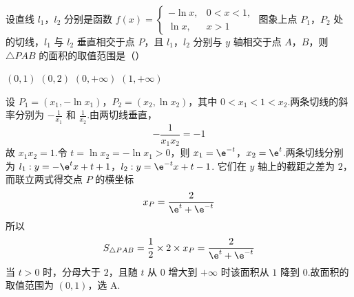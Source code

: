 \begin{problem}
设直线 \(l_1\)，\(l_2\) 分别是函数
\(f(x)=\begin{cases}
-\ln x,&0<x<1,\\
\ln x,&x>1
\end{cases}\)
图象上点 \(P_1\)，\(P_2\) 处的切线，\(l_1\) 与 \(l_2\) 垂直相交于点 \(P\)，且 \(l_1\)，\(l_2\) 分别与 \(y\) 轴相交于点 \(A\)，\(B\)，则 \(\triangle PAB\) 的面积的取值范围是（\quad）

\choices
    {\(\left(0,1\right)\)}
    {\(\left(0,2\right)\)}
    {\(\left(0,+\infty\right)\)}
    {\(\left(1,+\infty\right)\)}

\begin{solution}
设 \(P_1=(x_1,-\ln x_1)\)，\(P_2=(x_2,\ln x_2)\)，其中 \(0<x_1<1<x_2\).两条切线的斜率分别为 \(-\frac{1}{x_1}\) 和 \(\frac{1}{x_2}\).由两切线垂直，
\[
-\frac1{x_1x_2}=-1
\]
故 \(x_1x_2=1\).令 \(t=\ln x_2=-\ln x_1>0\)，则 \(x_1=\e^{-t}\)，\(x_2=\e^t\).两条切线分别为
\(l_1:y=-\e^tx+t+1\)，\(l_2:y=\e^{-t}x+t-1\).
它们在 \(y\) 轴上的截距之差为 \(2\)，而联立两式得交点 \(P\) 的横坐标
\[
x_P=\frac{2}{\e^t+\e^{-t}}
\]
所以
\[
S_{\triangle PAB}=\frac12\times2\times x_P=\frac{2}{\e^t+\e^{-t}}
\]
当 \(t>0\) 时，分母大于 \(2\)，且随 \(t\) 从 \(0\) 增大到 \(+\infty\) 时该面积从 \(1\) 降到 \(0\).故面积的取值范围为 \((0,1)\)，选 A.
\end{solution}
\end{problem}




